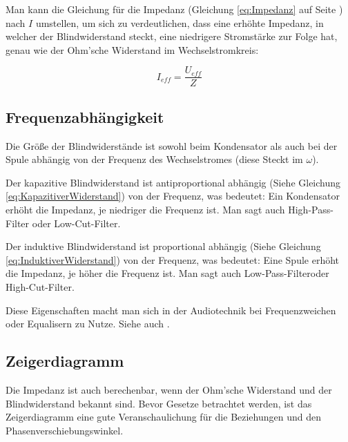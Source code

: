Man kann die Gleichung für die Impedanz (Gleichung \ref{eq:Impedanz} auf Seite \pageref{eq:Impedanz}) nach $I$ umstellen, um sich zu verdeutlichen, dass eine erhöhte Impedanz, in welcher der Blindwiderstand steckt, eine niedrigere Stromstärke zur Folge hat, genau wie der Ohm'sche Widerstand im Wechselstromkreis:

\begin{equation}	\label{eq:ImitZ}
	I_{eff}=\frac{U_{eff}}{Z}
\end{equation}


\subsection{Frequenzabhängigkeit}	\label{subsec:Frequenzabhaengigkeit}

Die Größe der Blindwiderstände ist sowohl beim Kondensator als auch bei der Spule abhängig von der Frequenz des Wechselstromes (diese Steckt im $\omega$).

Der kapazitive Blindwiderstand ist antiproportional abhängig (Siehe Gleichung \ref{eq:KapazitiverWiderstand}) von der Frequenz, was bedeutet: \glqq Ein Kondensator erhöht die Impedanz, je niedriger die Frequenz ist.\grqq{} Man sagt auch \glqq High-Pass-Filter\grqq{} oder \glqq Low-Cut-Filter\grqq .

Der induktive Blindwiderstand ist proportional abhängig (Siehe Gleichung \ref{eq:InduktiverWiderstand}) von der Frequenz, was bedeutet: \glqq Eine Spule erhöht die Impedanz, je höher die Frequenz ist.\grqq{} Man sagt auch \glqq Low-Pass-Filter\grqq oder \glqq High-Cut-Filter\grqq .

Diese Eigenschaften macht man sich in der Audiotechnik bei Frequenzweichen oder Equalisern zu Nutze. Siehe auch .



\subsection{Zeigerdiagramm}	\label{subsec:WiderstaendeZeigerdiagram}

Die Impedanz ist auch berechenbar, wenn der Ohm'sche Widerstand und der Blindwiderstand bekannt sind. Bevor Gesetze betrachtet werden, ist das Zeigerdiagramm eine gute Veranschaulichung für die Beziehungen und den Phasenverschiebungswinkel.

